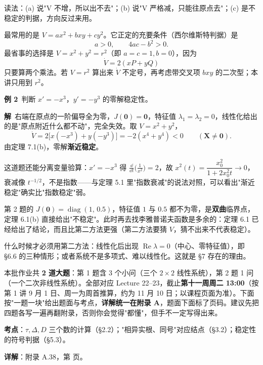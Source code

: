 \documentclass[11pt]{ctexart}
\renewcommand{\qbreak}{\needspace{0.26\textheight}}
\newcommand{\X}{\mathbf{X}}\newcommand{\Y}{\mathbf{Y}}
\newcommand{\Jac}{J}
\begin{document}
读法：(a) 说"V 不增，所以出不去"；(b) 说"V 严格减，只能往原点去"；(c) 是不稳定的判据，方向反过来用。


最常用的是 $V=ax^{2}+bxy+cy^{2}$。它正定的充要条件（西尔维斯特判据）是
\[
a>0,\qquad 4ac-b^{2}>0 .
\tag{7.1}
\]
最省事的选择是 $V=x^{2}+y^{2}=r^{2}$（即 $a=c=1,b=0$），因为
\[
\dot V=2(xP+yQ)
\]
只要算两个乘法。若 $V=r^{2}$ 算出来 $\dot V$ 不定号，再考虑带交叉项 $bxy$ 的二次型；本讲只用到 $r^{2}$。


\textbf{例 2}\ 判断 $x'=-x^{3}$，$y'=-y^{3}$ 的零解稳定性。

\textbf{解}\ 右端在原点的一阶偏导全为零，$\Jac(\mathbf{0})=\mathbf{0}$，特征值 $\lambda_{1}=\lambda_{2}=0$，线性化给出的是"原点附近什么都不动"，完全失效。取 $V=x^{2}+y^{2}$，
\[
\dot V=2\big[x(-x^{3})+y(-y^{3})\big]=-2(x^{4}+y^{4})<0\qquad(\X\neq\mathbf{0}).
\]
由定理 7.1(b)，零解\textbf{渐近稳定}。

这道题还能分离变量验算：$x'=-x^{3}$ 得 $\frac{\dd}{\dd t}\big(\frac{1}{x^{2}}\big)=2$，故 $x^{2}(t)=\dfrac{x_0^{2}}{1+2x_0^{2}t}\to0$，衰减像 $t^{-1/2}$，不是指数——与定理 5.1 里"指数衰减"的说法对照，可以看出"渐近稳定"确实比"指数稳定"弱。


第 2 题的 $\Jac(\mathbf{0})=\operatorname{diag}(1,\,0.5)$，特征值 $1$ 与 $0.5$ 都不为零，是\textbf{双曲}临界点，定理 6.1(b) 直接给出"不稳定"。此时再去找李雅普诺夫函数是多余的：定理 6.1 已经给出了结论，而且比第二方法更强（第二方法要猜 $V$，猜不出来不代表稳定）。

什么时候才必须用第二方法：线性化后出现 $\operatorname{Re}\lambda=0$（中心、零特征值），即 §6.6 的三种情形；或者系统不是多项式、难以线性化。这就是 §7 存在的理由。

\needspace{0.32\textheight}

本批作业共 \textbf{2 道大题}：第 1 题含 3 个小问（三个 $2\times2$ 线性系统），第 2 题 1 问（一个二次非线性系统）。全部对应 Lecture 22--23，截止\textbf{第十一周周二 13:00}（按第 1 讲 9 月 1 日、周一为周首推算，约为 11 月 10 日；以课程页面为准）。下面按"一题一块"给出题面与考点，\textbf{详解统一在附录 A}，题面下面标了页码。建议先把四题各写一遍再翻附录，否则你会觉得"都懂"，但手不一定写得出来。

\qbreak
{}
\textbf{考点}：$\tau,\Delta,D$ 三个数的计算（§2.2）；"相异实根、同号"对应结点（§3.2）；稳定性的符号判据（§5.3）。
\par\textbf{详解}：附录 A.38，第 \pageref{c6:app:a1} 页。
\end{document}
